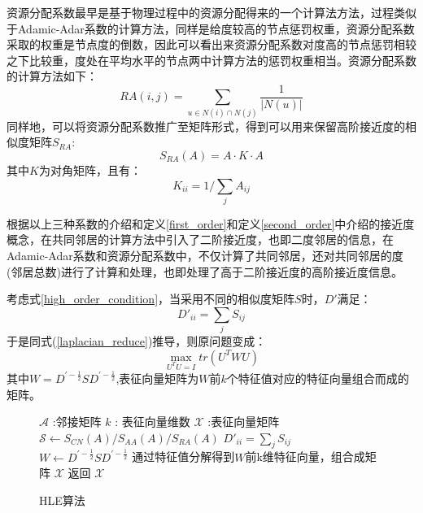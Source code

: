 资源分配系数最早是基于物理过程中的资源分配得来的一个计算法方法，过程类似于Adamic-Adar系数的计算方法，同样是给度较高的节点惩罚权重，资源分配系数采取的权重是节点度的倒数，因此可以看出来资源分配系数对度高的节点惩罚相较之下比较重，度处在平均水平的节点两中计算方法的惩罚权重相当。资源分配系数的计算方法如下：
\begin{equation}
	RA(i,j) =  \sum_{u \in N(i)\cap N(j)} \frac{1}{|N(u)|}
\end{equation}
同样地，可以将资源分配系数推广至矩阵形式，得到可以用来保留高阶接近度的相似度矩阵$S_{RA}$:
\begin{equation}
	S_{RA}(A) = A\cdot K \cdot A
\end{equation}
其中$K$为对角矩阵，且有：
\begin{equation}
	K_{ii} = 1/\sum_jA_{ij}
\end{equation}

根据以上三种系数的介绍和定义\ref{first_order}和定义\ref{second_order}中介绍的接近度概念，在共同邻居的计算方法中引入了二阶接近度，也即二度邻居的信息，在Adamic-Adar系数和资源分配系数中，不仅计算了共同邻居，还对共同邻居的度(邻居总数)进行了计算和处理，也即处理了高于二阶接近度的高阶接近度信息。

考虑式\ref{high_order_condition}，当采用不同的相似度矩阵$S$时，$D'$满足：
\begin{equation}
D'_{ii} = \sum_j{S_{ij}}
\end{equation}
于是同式(\ref{laplacian_reduce})推导，则原问题变成：
\begin{equation}
\max_{U^TU = I} tr(U^TWU)
\end{equation}
其中$W = D^{\prime-\frac{1}{2}}SD^{\prime-\frac{1}{2}}$,表征向量矩阵为$W$前$k$个特征值对应的特征向量组合而成的矩阵。

\begin{figure}[htb]
	\centering
	\begin{minipage}{.7\linewidth}
		\begin{algorithm}[H]
			\small
			\caption{HLE算法}
			\begin{algorithmic}[1]
				\Require
				\Statex $\mathcal{A}$ :邻接矩阵
				\Statex $k$ : 表征向量维数
				\Ensure
				\Statex $\mathcal{X}$ :表征向量矩阵
				\Statex
				\State $\mathcal{S} \leftarrow S_{CN}(A) /S_{AA}(A) / S_{RA}(A)$
				\State $D'_{ii} = \sum_j S_{ij}$
				\State $W \leftarrow  D^{\prime-\frac{1}{2}}SD^{\prime-\frac{1}{2}}$
				\State 通过特征值分解得到$W$前k维特征向量，组合成矩阵 $\mathcal{X}$
				\State 返回 $\mathcal{X}$
			\end{algorithmic}
		\end{algorithm}
	\end{minipage}
\end{figure}

